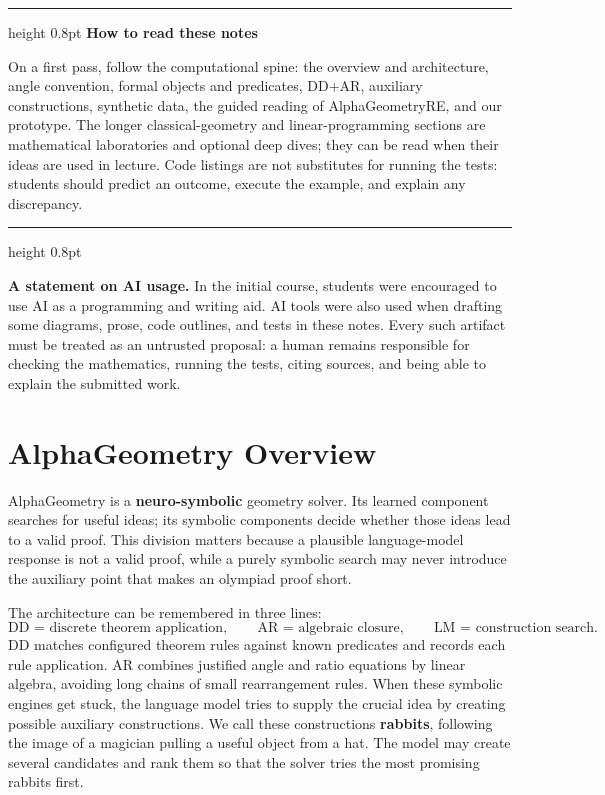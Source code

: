 \documentclass[reqno]{amsart}
\newenvironment{lecturebox}[1]{%
    \par\medskip
    \noindent\begingroup
    \setlength{\parindent}{0pt}
    \color{agblue}\hrule height 0.8pt\color{black}
    \smallskip
    \textbf{\color{agblue}#1}\par\smallskip
}{%
    \smallskip
    \color{agblue}\hrule height 0.8pt\color{black}
    \endgroup
    \medskip
}
\newcommand{\keyterm}[1]{\textbf{\color{agblue}#1}}
\DeclareMathOperator{\1}{\textbf{1}}
\begin{document}
\begin{lecturebox}{How to read these notes}
On a first pass, follow the computational spine: the overview and architecture,
angle convention, formal objects and predicates, DD+AR, auxiliary
constructions, synthetic data, the guided reading of AlphaGeometryRE, and our
prototype.  The longer classical-geometry and linear-programming sections are
mathematical laboratories and optional deep dives; they can be read when their
ideas are used in lecture.  Code listings are not substitutes for running the
tests: students should predict an outcome, execute the example, and explain
any discrepancy.
\end{lecturebox}

\noindent\textbf{A statement on AI usage.}
In the initial course, students were encouraged to use AI as a programming and
writing aid.  AI tools were also used when drafting some diagrams, prose, code
outlines, and tests in these notes.  Every such artifact must be treated as an
untrusted proposal: a human remains responsible for checking the mathematics,
running the tests, citing sources, and being able to explain the submitted
work.

\section{AlphaGeometry Overview}
AlphaGeometry is a \keyterm{neuro-symbolic} geometry solver. Its learned
component searches for useful ideas; its symbolic components decide whether
those ideas lead to a valid proof. This division matters because a plausible
language-model response is not a valid proof, while a purely symbolic search
may never introduce the auxiliary point that makes an olympiad proof short.

The architecture can be remembered in three lines:
\[
\boxed{\text{DD = discrete theorem application}},\qquad
\boxed{\text{AR = algebraic closure}},\qquad
\boxed{\text{LM = construction search}}.
\]
DD matches configured theorem rules against known predicates and records each
rule application. AR combines justified angle and ratio equations by linear
algebra, avoiding long chains of small rearrangement rules. When these
symbolic engines get stuck, the language model tries to supply the crucial
idea by creating possible auxiliary constructions. We call these constructions
\keyterm{rabbits}, following the image of a magician pulling a useful object
from a hat. The model may create several candidates and rank them so that the
solver tries the most promising rabbits first.
\end{document}
